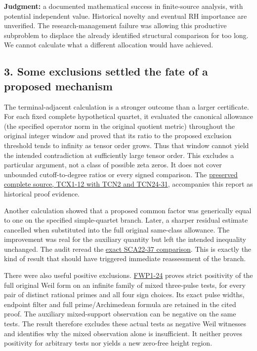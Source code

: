 \documentclass[
  british,
  11pt,
  a4paper,
]{article}
\begin{document}
\textbf{Judgment:} a documented mathematical success in finite-source
analysis, with potential independent value. Historical novelty and
eventual RH importance are unverified. The research-management failure
was allowing this productive subproblem to displace the already
identified structural comparison for too long. We cannot calculate what
a different allocation would have achieved.

\subsection{3. Some exclusions settled the fate of a proposed
mechanism}\label{some-exclusions-settled-the-fate-of-a-proposed-mechanism}

The terminal-adjacent calculation is a stronger outcome than a larger
certificate. For each fixed complete hypothetical quartet, it evaluated
the canonical allowance (the specified operator norm in the original
quotient metric) throughout the original integer window and proved that
its ratio to the proposed exclusion threshold tends to infinity as
tensor order grows. Thus that window cannot yield the intended
contradiction at sufficiently large tensor order. This excludes a
particular argument, not a class of possible zeta zeros. It does not
cover unbounded cutoff-to-degree ratios or every signed comparison. The
\href{https://github.com/KokunoYumeto/zeta-function-research-reader/blob/main/workbenches/splitzero-tandem/research-self-audit/supporting_proofs/Terminal_Adjacent_Window_Standalone.tex}{preserved
complete source, TCX1-12 with TCN2 and TCN24-31}, accompanies this
report as historical proof evidence.

Another calculation showed that a proposed common factor was generically
equal to one on the specified simple-quartet branch. Later, a sharper
residual estimate cancelled when substituted into the full original
same-class allowance. The improvement was real for the auxiliary
quantity but left the intended inequality unchanged. The audit reread
the
\href{https://github.com/KokunoYumeto/zeta-function-research-reader/blob/main/workbenches/splitzero-tandem/research-self-audit/supporting_proofs/SAME_CLASS_RELATION_ALLOWANCE.tex}{exact
SCA22-37 comparison}. This is exactly the kind of result that should
have triggered immediate reassessment of the branch.

There were also useful positive exclusions.
\href{https://github.com/KokunoYumeto/zeta-function-research-reader/blob/e1dc06aa68bb810cf7d8b0006942f5b036b8b765/workbenches/splitzero-tandem/continuations/20260923-full-prime-support/033/MIXED_PRIME_ENERGY_AND_BOUNDARY.tex\#L663}{FWP1-24}
proves strict positivity of the full original Weil form on an infinite
family of mixed three-pulse tests, for every pair of distinct rational
primes and all four sign choices. Its exact pulse widths, endpoint
filter and full prime/Archimedean formula are retained in the cited
proof. The auxiliary mixed-support observation can be negative on the
same tests. The result therefore excludes these actual tests as negative
Weil witnesses and identifies why the mixed observation alone is
insufficient. It neither proves positivity for arbitrary tests nor
yields a new zero-free height region.
\end{document}
